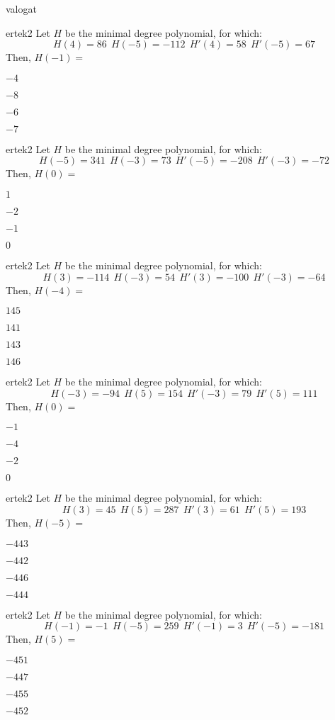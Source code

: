 \documentclass[12pt]{article}
\begin{document}
\begin{quiz}{valogat}
\begin{multi}{ertek2}
Let $H$ be the minimal degree polynomial, for which:
$$
H(4)=86\ \ H(-5)=-112 \ \ H'(4)=58 \ \ H'(-5)=67
$$
Then, $H(-1)=$
\item* $ -4 $
\item  $ -8 $
\item  $ -6 $
\item  $ -7 $
\end{multi}\begin{multi}{ertek2}
Let $H$ be the minimal degree polynomial, for which:
$$
H(-5)=341\ \ H(-3)=73 \ \ H'(-5)=-208 \ \ H'(-3)=-72
$$
Then, $H(0)=$
\item* $ 1 $
\item  $ -2 $
\item  $ -1 $
\item  $ 0 $
\end{multi}\begin{multi}{ertek2}
Let $H$ be the minimal degree polynomial, for which:
$$
H(3)=-114\ \ H(-3)=54 \ \ H'(3)=-100 \ \ H'(-3)=-64
$$
Then, $H(-4)=$
\item* $ 145 $
\item  $ 141 $
\item  $ 143 $
\item  $ 146 $
\end{multi}\begin{multi}{ertek2}
Let $H$ be the minimal degree polynomial, for which:
$$
H(-3)=-94\ \ H(5)=154 \ \ H'(-3)=79 \ \ H'(5)=111
$$
Then, $H(0)=$
\item* $ -1 $
\item  $ -4 $
\item  $ -2 $
\item  $ 0 $
\end{multi}\begin{multi}{ertek2}
Let $H$ be the minimal degree polynomial, for which:
$$
H(3)=45\ \ H(5)=287 \ \ H'(3)=61 \ \ H'(5)=193
$$
Then, $H(-5)=$
\item* $ -443 $
\item  $ -442 $
\item  $ -446 $
\item  $ -444 $
\end{multi}\begin{multi}{ertek2}
Let $H$ be the minimal degree polynomial, for which:
$$
H(-1)=-1\ \ H(-5)=259 \ \ H'(-1)=3 \ \ H'(-5)=-181
$$
Then, $H(5)=$
\item* $ -451 $
\item  $ -447 $
\item  $ -455 $
\item  $ -452 $

\end{multi}
\end{quiz}
\end{document}
